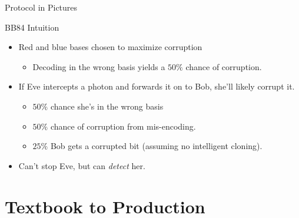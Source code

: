 \documentclass[pdf]{beamer}
\begin{document}
\begin{frame}{Protocol in Pictures}
\begin{center}
  \end{center}
  \vspace{10pt}
\end{frame}

\begin{frame}{BB84 Intuition}
  \begin{itemize}
  \item Red and blue bases chosen to maximize corruption
    \begin{itemize}
    \item Decoding in the wrong basis yields a $50\%$ chance of corruption.
    \end{itemize}
  \item If Eve intercepts a photon and forwards it on to Bob, she'll likely
    corrupt it.
    \begin{itemize}
    \item $50\%$ chance she's in the wrong basis
    \item $50\%$ chance of corruption from mis-encoding.
    \item $25\%$ Bob gets a corrupted bit (assuming no intelligent cloning).
    \end{itemize}
  \item Can't stop Eve, but can \emph{detect} her.
  \end{itemize}
\end{frame}

\section{Textbook to Production}
\end{document}
